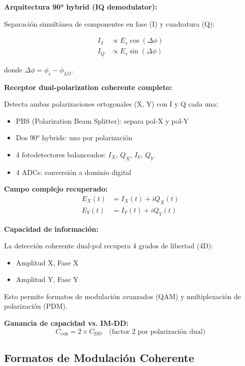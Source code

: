 \documentclass[11pt,a4paper]{article}
\begin{document}
\textbf{Arquitectura 90° hybrid (IQ demodulator):}

Separación simultánea de componentes en fase (I) y cuadratura (Q):

\begin{align}
    I_I &\propto E_s \cos(\Delta\phi) \\
    I_Q &\propto E_s \sin(\Delta\phi)
\end{align}

donde $\Delta\phi = \phi_s - \phi_{LO}$.

\textbf{Receptor dual-polarization coherente completo:}

Detecta ambas polarizaciones ortogonales (X, Y) con I y Q cada una:
\begin{itemize}
    \item PBS (Polarization Beam Splitter): separa pol-X y pol-Y
    \item Dos 90° hybrids: uno por polarización
    \item 4 fotodetectores balanceados: $I_X$, $Q_X$, $I_Y$, $Q_Y$
    \item 4 ADCs: conversión a dominio digital
\end{itemize}

\textbf{Campo complejo recuperado:}
\begin{align}
    E_X(t) &= I_X(t) + iQ_X(t) \\
    E_Y(t) &= I_Y(t) + iQ_Y(t)
\end{align}

\begin{importante}
\textbf{Capacidad de información:}

La detección coherente dual-pol recupera 4 grados de libertad (4D):
\begin{itemize}
    \item Amplitud X, Fase X
    \item Amplitud Y, Fase Y
\end{itemize}

Esto permite formatos de modulación avanzados (QAM) y multiplexación de polarización (PDM).

\textbf{Ganancia de capacidad vs. IM-DD:}
\begin{equation}
    C_{\text{coh}} = 2 \times C_{\text{DD}} \quad \text{(factor 2 por polarización dual)}
\end{equation}
\end{importante}

\subsection{Formatos de Modulación Coherente}
\end{document}
